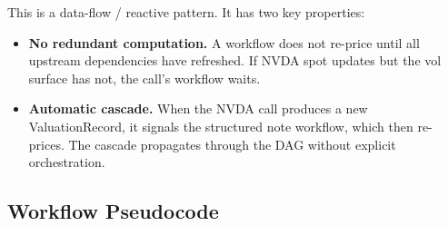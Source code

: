 \documentclass[11pt,a4paper]{article}
\begin{document}
\noindent This is a data-flow / reactive pattern.  It has two key properties:

\begin{itemize}[nosep]
\item \textbf{No redundant computation.}  A workflow does not re-price until all upstream dependencies have refreshed.  If NVDA spot updates but the vol surface has not, the call's workflow waits.
\item \textbf{Automatic cascade.}  When the NVDA call produces a new ValuationRecord, it signals the structured note workflow, which then re-prices.  The cascade propagates through the DAG without explicit orchestration.
\end{itemize}

\subsection{Workflow Pseudocode}
\end{document}

